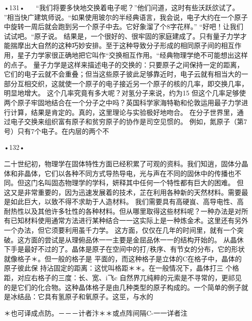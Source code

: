 •131•
  
“我们将要多快地交换着电子呢？”他们问道，这时有些沃跃欱试了。
”相当快广建筑师说。“如果使用玻尔的半经典语言，我会说，电子大约在一个原子中旋转一周后就会跑到另一个原子中去。它好象溜了个8字花样。”
“好吧！让我们试试吧。“原子说。
结果是，一个很好的、很牢固的家庭建成了。只有量子力学才能揣摩出大自然的这种巧妙安排。至于这种导致分子形成的相同原子间的相互作用，星子力学家很正确地把它叫作“交换相互作用。“经典物理学绝不可能想出这样的点子。
量子力学是这样来描述电子的交换的：只要原子之间保持一定的距离，它们的电子云就不会重叠；但当这些原子彼此足够靠近时，电子云就有相当大的一部分互相交织，这就使一个原子的电子接近另一个原子的核的几率，即交换几率，明显地增大。
这个几率究竟有多大呢？对氢分子来说，约为15%
但这个几率足够使两个原子牢固地结合在一个分子之中吗？英国科学家海特勒和伦敦运用最子力学进行计算，结果是肯定的。真的，这里理论与实验极好地吻合。
在分子世界里，通过电子交换来组织富有原子和贫穷原子的协作是司空见惯的。
例如，氮原子（第7号）只有7个电子。在内层的两个不

•132•
  

二十世纪初，物理学在固体特性方面已经积累了可观的资料。我们知逍，固体分晶体和非晶体，它们以各种不同方式导热导电，光与声在不同的固休中的传播也不同。但这门名叫固态物理学的学科，妍释其中任何一个特性都有巨大的困难。
但这又是非常重要的，因为迅速发展着的技术，芷在利用各种新的天然材料。需要最是如此巨大，以致不得不求助于人造材料。
我们需要具有高硬峎、高导电性、高耐热性以及其他许多牡性的各种材料。但从哪里取得这些材料呢？一种办法是对所有已知材料使用通常方法进行某种结合一一这实际上是一种炼金术。这里还有另外一个办法，但它须要利用虽千力学。
这方面，仅仅在几年的时间里，就有一个突破。这方面的尝试是从理俯品休一一主要是金屈品休一一的结构开始的。
从晶休下手是最好不过的了。晶体是原子在空间中的打/秩序、有节女的分布，它的形状就像格子＊。但一般的格子是
平面的，而这种格子是立体的C在格子中，晶体的原子彼此保
持沾固定的距离：这忧叫格距＊＊。在一般情况下，晶体打三
个格距，对应右格子的三度：长、宽、i飞c
自然界兀纯粹的元索是不寻常的，更祁见的是它们的化合物。这种晶体格子是由几种类型的原子构成的。一个简单的例子就是冰结品：它具有氢原子和氧原子。这巠，与水的

＊也可译成点防。－－－计者汴＊＊或点阵间隔C-一一详者注

